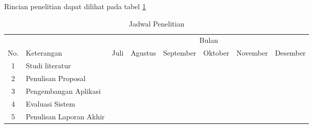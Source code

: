 \par Rincian penelitian dapat dilihat pada tabel \ref{tabelwaktupenelitian}
\begin{table}[H]
	\small
	\fontsize{10pt}{20pt}
	\selectfont
	\caption{Jadwal Penelitian}
	\label{tabelwaktupenelitian}
	\begin{tabular}{|c|l|l|l|l|l|l|l|}
		\hline
		                      &                              & \multicolumn{6}{c|}{Bulan}                                                                                                                                                             \\ \cline{3-8}
		\multirow{-2}{*}{No.} & \multirow{-2}{*}{Keterangan} & Juli                                            & Agustus                  & September                & Oktober                  & November                 & Desember                 \\ \hline
		1                     & Studi literatur              & \cellcolor[HTML]{9B9B9B}{\color[HTML]{9B9B9B} } & \cellcolor[HTML]{9B9B9B} &                          &                          &                          &                          \\ \hline
		2                     & Penulisan Proposal           &                                                 & \cellcolor[HTML]{9B9B9B} & \cellcolor[HTML]{9B9B9B} &                          &                          &                          \\ \hline
		3                     & Pengembangan Aplikasi        &                                                 &                          & \cellcolor[HTML]{9B9B9B} & \cellcolor[HTML]{9B9B9B} & \cellcolor[HTML]{9B9B9B} &                          \\ \hline
		4                     & Evaluasi Sistem              &                                                 &                          &                          &                          & \cellcolor[HTML]{9B9B9B} &                          \\ \hline
		5                     & Penulisan Laporan Akhir      &                                                 &                          &                          &                          &                          & \cellcolor[HTML]{9B9B9B} \\ \hline
	\end{tabular}
\end{table}

